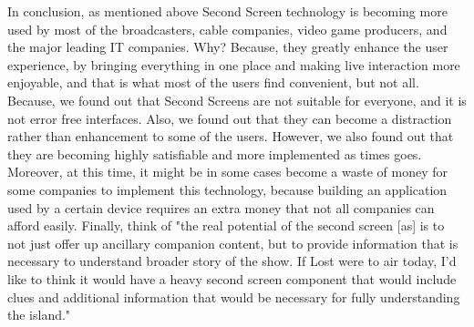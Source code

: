 \documentclass[12pt, oneside]{amsart}   	%
\begin{document}
In conclusion, as mentioned above Second Screen technology is becoming more used by most of the broadcasters, cable companies, video game producers, and the major leading IT companies.  Why? Because, they greatly enhance the user experience, by bringing everything in one place and making live interaction more enjoyable, and that is what most of the users find convenient, but not all. Because, we found out that Second Screens are not suitable for everyone, and it is not error free interfaces.  Also, we found out that they can become a distraction rather than enhancement to some of the users.  However, we also found out that they are becoming highly satisfiable and more implemented as times goes.  Moreover, at this time, it might be in some cases become a waste of money for some companies to implement this technology, because building an application used by a certain device requires an extra money that not all companies can afford easily. Finally, think of "the real potential of the second screen [as] is to not just offer up ancillary companion content, but to provide information that is necessary to understand broader story of the show. If Lost were to air today, I'd like to think it would have a heavy second screen component that would include clues and additional information that would be necessary for fully understanding the island."\cite{Second-Screen-His}
 
 

 
 
\end{document}

